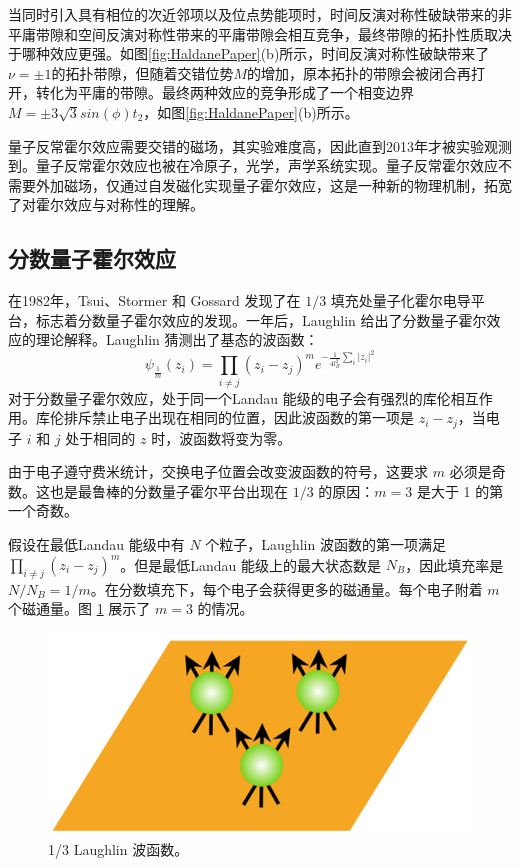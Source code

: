 当同时引入具有相位的次近邻项以及位点势能项时，时间反演对称性破缺带来的非平庸带隙和空间反演对称性带来的平庸带隙会相互竞争，最终带隙的拓扑性质取决于哪种效应更强。如图\ref{fig:HaldanePaper}(b)所示，时间反演对称性破缺带来了$\nu=\pm1$的拓扑带隙，但随着交错位势$M$的增加，原本拓扑的带隙会被闭合再打开，转化为平庸的带隙。最终两种效应的竞争形成了一个相变边界$M=\pm3\sqrt{3}sin(\phi)t_2$，如图\ref{fig:HaldanePaper}(b)所示。

量子反常霍尔效应需要交错的磁场，其实验难度高，因此直到2013年才被实验观测到\cite{chang2013experimental}。量子反常霍尔效应也被在冷原子\cite{jotzu2014experimental}，光学\cite{mittal2019photonic,liu2021gain}，声学\cite{li2018weyl}系统实现。量子反常霍尔效应不需要外加磁场，仅通过自发磁化实现量子霍尔效应，这是一种新的物理机制，拓宽了对霍尔效应与对称性的理解。

\subsection{分数量子霍尔效应}

在1982年，Tsui、Stormer 和 Gossard 发现了在 $1/3$ 填充处量子化霍尔电导平台\cite{PhysRevLett.48.1559}，标志着分数量子霍尔效应的发现。一年后，Laughlin 给出了分数量子霍尔效应的理论解释\cite{PhysRevLett.50.1395}。Laughlin 猜测出了基态的波函数：
\begin{equation}
    \psi_{\frac{1}{m}}\left(z_i\right)=\prod_{i \neq j}\left(z_i-z_j\right)^m e^{-\frac{1}{4 l_B^2} \sum_i\left|z_i\right|^2}
\end{equation}
对于分数量子霍尔效应，处于同一个Landau 能级的电子会有强烈的库伦相互作用。库伦排斥禁止电子出现在相同的位置，因此波函数的第一项是 $z_i-z_j$，当电子 $i$ 和 $j$ 处于相同的 $z$ 时，波函数将变为零。

由于电子遵守费米统计，交换电子位置会改变波函数的符号，这要求 $m$ 必须是奇数。这也是最鲁棒的分数量子霍尔平台出现在 $1/3$ 的原因：$m=3$ 是大于 1 的第一个奇数。

假设在最低Landau 能级中有 $N$ 个粒子，Laughlin 波函数的第一项满足 $\prod_{i \neq j}\left(z_i-z_j\right)^m$。但是最低Landau 能级上的最大状态数是 $N_B$，因此填充率是 $N/N_B=1/m$。在分数填充下，每个电子会获得更多的磁通量。每个电子附着 $m$ 个磁通量。图 \ref{fig:Laughlin} 展示了 $m=3$ 的情况。

\begin{figure}[htbp]
    \centering
    \includegraphics[width=0.35\linewidth]{figure/Introduction/Laughlin.png}
    \caption{1/3 Laughlin 波函数。}
    \label{fig:Laughlin}
\end{figure}

